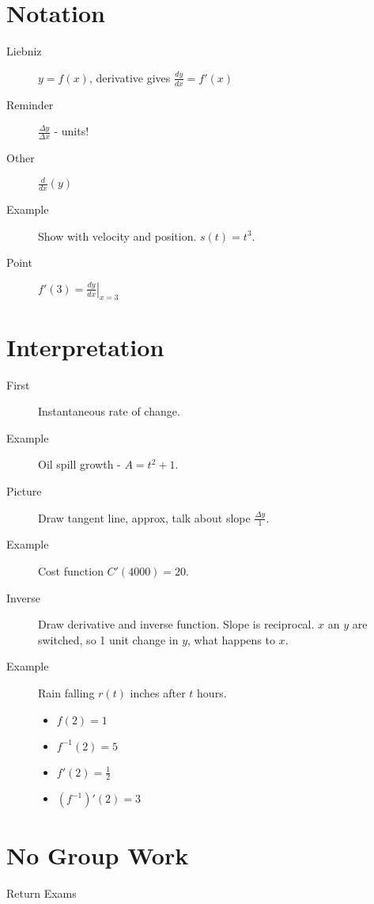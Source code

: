 \documentclass[11pt]{article}
\newcommand{\ds}{\displaystyle}
\begin{document}
\drawtitle

\section*{Notation}
\begin{description}
\item[Liebniz] $y=f(x)$, derivative gives $\ds\frac{dy}{dx} = f'(x)$
\item[Reminder] $\ds\frac{\Delta y}{\Delta x}$ - units!
\item[Other] $\ds\frac{d}{dx}(y)$
\item[Example] Show with velocity and position.  $s(t)=t^3$.
\item[Point] $\ds f'(3)=\left.\frac{dy}{dx}\right|_{x=3}$
\end{description}

\section*{Interpretation}
\begin{description}
\item[First] Instantaneous rate of change.
\item[Example] Oil spill growth - $A = t^2 + 1$.
\item[Picture] Draw tangent line, approx, talk about slope $\ds\frac{\Delta y}{1}$.
\item[Example] Cost function $C'(4000) = 20$.
\item[Inverse] Draw derivative and inverse function.  Slope is
  reciprocal.  $x$ an $y$ are switched, so 1 unit change in $y$, what happens to $x$.
\item[Example] Rain falling $r(t)$ inches after $t$ hours.
  \begin{itemize}
    \item $f(2)=1$
    \item $f^{-1}(2)=5$
    \item $f'(2)=\frac{1}{2}$
    \item $\left(f^{-1}\right)'(2)=3$
  \end{itemize}
\end{description}

\section*{No Group Work}
\begin{description}
\item[Return Exams]
\end{description}
\end{document}
